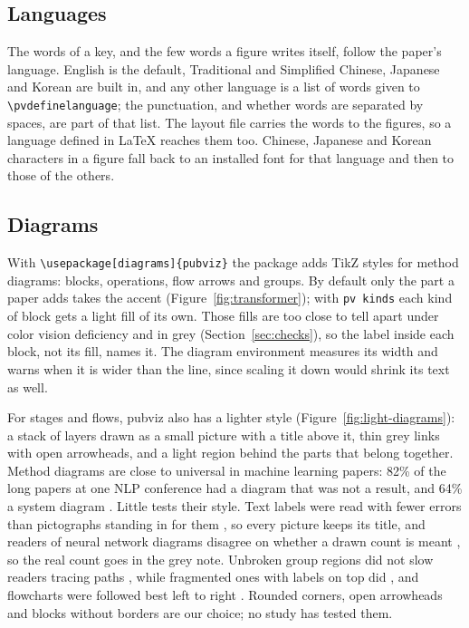 \documentclass[11pt]{article}
\newcommand\code[1]{\texttt{#1}}
\begin{document}
\subsection{Languages}

The words of a key, and the few words a figure writes itself, follow the
paper's language. English is the default, Traditional and Simplified Chinese,
Japanese and Korean are built in, and any other language is a list of words
given to \code{\textbackslash pvdefinelanguage}; the punctuation, and whether
words are separated by spaces, are part of that list. The layout file carries
the words to the figures, so a language defined in LaTeX reaches them too.
Chinese, Japanese and Korean characters in a figure fall back to an installed
font for that language and then to those of the others.

\subsection{Diagrams}

With \code{\textbackslash usepackage[diagrams]\{pubviz\}} the package adds
TikZ styles for method diagrams: blocks, operations, flow arrows and groups.
By default only the part a paper adds takes the accent
(Figure~\ref{fig:transformer}); with \code{pv kinds} each kind of block gets a
light fill of its own. Those fills are too close to tell apart under color
vision deficiency and in grey (Section~\ref{sec:checks}), so the label inside
each block, not its fill, names it. The diagram environment measures its
width and warns when it is wider than the line, since scaling it down would
shrink its text as well.

For stages and flows, pubviz also has a lighter style
(Figure~\ref{fig:light-diagrams}): a stack of layers drawn as a small picture
with a title above it, thin grey links with open arrowheads, and a light
region behind the parts that belong together. Method diagrams are close to
universal in machine learning papers: 82\% of the long papers at one NLP
conference had a diagram that was not a result, and 64\% a system diagram
\citep[Sec.~4.1]{marshall2021number}. Little tests their style. Text labels
were read with fewer errors than pictographs standing in for them
\citep[Exp.~1]{haroz2015isotype}, so every picture keeps its title, and readers
of neural network diagrams disagree on whether a drawn count is meant
\citep[Table~3]{marshall2025evidence}, so the real count goes in the grey
note. Unbroken group regions did not slow readers tracing paths
\citep[Sec.~5]{saket2014node}, while fragmented ones with labels on top did
\citep[Sec.~IV.B]{jianu2014how}, and flowcharts were followed best left to
right \citep[abstract]{krohn1983flowcharts}. Rounded corners, open arrowheads
and blocks without borders are our choice; no study has tested them.
\end{document}
